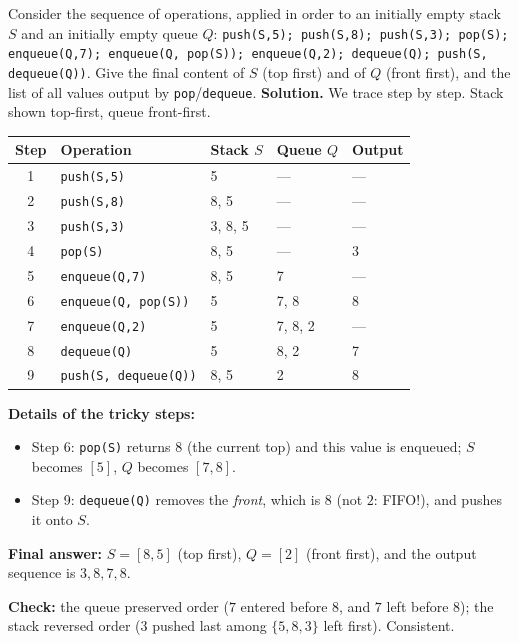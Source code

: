 \documentclass[11pt]{article}
\begin{document}
\begin{exoresolu}
Consider the sequence of operations, applied in order to an initially empty stack $S$ and an initially empty queue $Q$:
\texttt{push(S,5); push(S,8); push(S,3); pop(S); enqueue(Q,7); enqueue(Q, pop(S)); enqueue(Q,2); dequeue(Q); push(S, dequeue(Q))}.
Give the final content of $S$ (top first) and of $Q$ (front first), and the list of all values output by \texttt{pop}/\texttt{dequeue}.
\tcblower
\textbf{Solution.} We trace step by step. Stack shown top-first, queue front-first.

\begin{center}
\begin{tabularx}{\linewidth}{|c|X|l|l|l|}
\hline
\rowcolor{popblueL} \textbf{Step} & \textbf{Operation} & \textbf{Stack $S$} & \textbf{Queue $Q$} & \textbf{Output} \\
\hline
1 & \texttt{push(S,5)} & 5 & --- & --- \\
\hline
2 & \texttt{push(S,8)} & 8, 5 & --- & --- \\
\hline
3 & \texttt{push(S,3)} & 3, 8, 5 & --- & --- \\
\hline
4 & \texttt{pop(S)} & 8, 5 & --- & 3 \\
\hline
5 & \texttt{enqueue(Q,7)} & 8, 5 & 7 & --- \\
\hline
6 & \texttt{enqueue(Q, pop(S))} & 5 & 7, 8 & 8 \\
\hline
7 & \texttt{enqueue(Q,2)} & 5 & 7, 8, 2 & --- \\
\hline
8 & \texttt{dequeue(Q)} & 5 & 8, 2 & 7 \\
\hline
9 & \texttt{push(S, dequeue(Q))} & 8, 5 & 2 & 8 \\
\hline
\end{tabularx}
\end{center}

\textbf{Details of the tricky steps:}
\begin{itemize}
\item Step 6: \texttt{pop(S)} returns $8$ (the current top) and this value is enqueued; $S$ becomes $[5]$, $Q$ becomes $[7,8]$.
\item Step 9: \texttt{dequeue(Q)} removes the \emph{front}, which is $8$ (not $2$: FIFO!), and pushes it onto $S$.
\end{itemize}

\textbf{Final answer:} $S = [8, 5]$ (top first), $Q = [2]$ (front first), and the output sequence is $3, 8, 7, 8$.

\textbf{Check:} the queue preserved order ($7$ entered before $8$, and $7$ left before $8$); the stack reversed order ($3$ pushed last among $\{5,8,3\}$ left first). Consistent.
\end{exoresolu}
\end{document}
